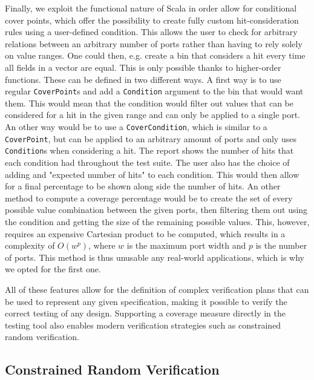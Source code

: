 \documentclass[conference]{IEEEtran}
\begin{document}
Finally, we exploit the functional nature of Scala in order allow for conditional cover points, which offer the possibility to create fully custom hit-consideration rules using a user-defined condition. 
This allows the user to check for arbitrary relations between an arbitrary number of ports rather than having to rely solely on value ranges. 
One could then, e.g. create a bin that considers a hit every time all fields in a vector are equal. 
This is only possible thanks to higher-order functions. 
These can be defined in two different ways. 
A first way is to use regular \texttt{CoverPoint}s and add a \texttt{Condition} argument to the bin that would want them. 
This would mean that the condition would filter out values that can be considered for a hit in the given range and can only be applied to a single port. 
An other way would be to use a \texttt{CoverCondition}, which is similar to a \texttt{CoverPoint}, but can be applied to an arbitrary amount of ports and only uses \texttt{Condition}s when considering a hit.
The report shows the number of hits that each condition had throughout the test suite.
The user also has the choice of adding and "expected number of hits" to each condition.
This would then allow for a final percentage to be shown along side the number of hits.
An other method to compute a coverage percentage would be to create the set of every possible value combination between the given ports, then filtering them out using the condition and getting the size of the remaining possible values.
This, however, requires an expensive Cartesian product to be computed, which results in a complexity of $O(w^{p})$, where $w$ is the maximum port width and $p$ is the number of ports.
This method is thus unusable any real-world applications, which is why we opted for the first one.

All of these features allow for the definition of complex verification plans that can be used to represent any given specification, making it possible to verify the correct testing of any design.
Supporting a coverage measure directly in the testing tool also enables modern verification strategies such as constrained random verification.

\subsection{Constrained Random Verification}


%
\end{document}
